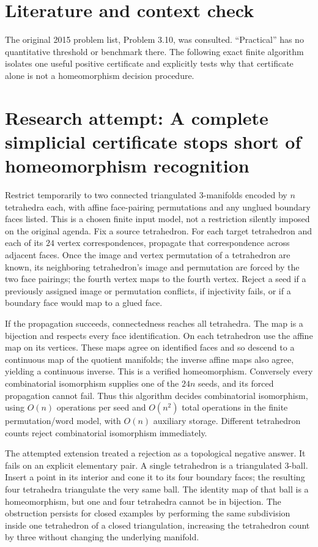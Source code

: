 \documentclass[11pt]{article}
\begin{document}
\section{Literature and context check}
The original 2015 problem list, Problem 3.10, was consulted. ``Practical''
has no quantitative threshold or benchmark there. The following exact finite
algorithm isolates one useful positive certificate and explicitly tests why
that certificate alone is not a homeomorphism decision procedure.
\section{Research attempt: A complete simplicial certificate stops short of homeomorphism recognition}
Restrict temporarily to two connected triangulated $3$-manifolds encoded by
$n$ tetrahedra each, with affine face-pairing permutations and any unglued boundary
faces listed. This is a chosen finite input model, not a restriction silently
imposed on the original agenda. Fix a source tetrahedron. For each target
tetrahedron and each of its $24$ vertex correspondences, propagate that
correspondence across adjacent faces. Once the image and vertex permutation of
a tetrahedron are known, its neighboring tetrahedron's image and permutation
are forced by the two face pairings; the fourth vertex maps to the fourth
vertex. Reject a seed if a previously assigned image or permutation conflicts,
if injectivity fails, or if a boundary face would map to a glued face.

If the propagation succeeds, connectedness reaches all tetrahedra. The map is
a bijection and respects every face identification. On each tetrahedron use
the affine map on its vertices. These maps agree on identified faces and so
descend to a continuous map of the quotient manifolds; the inverse affine maps
also agree, yielding a continuous inverse. This is a verified homeomorphism.
Conversely every combinatorial isomorphism supplies one of the $24n$ seeds,
and its forced propagation cannot fail. Thus this algorithm decides
combinatorial isomorphism, using $O(n)$ operations per seed and $O(n^2)$ total
operations in the finite permutation/word model, with $O(n)$ auxiliary storage.
Different tetrahedron counts reject combinatorial isomorphism immediately.

The attempted extension treated a rejection as a topological negative answer.
It fails on an explicit elementary pair. A single tetrahedron is a triangulated
$3$-ball. Insert a point in its interior and cone it to its four boundary faces;
the resulting four tetrahedra triangulate the very same ball. The identity map
of that ball is a homeomorphism, but one and four tetrahedra cannot be in
bijection. The obstruction persists for closed examples by performing the same
subdivision inside one tetrahedron of a closed triangulation, increasing the
tetrahedron count by three without changing the underlying manifold.
\end{document}
